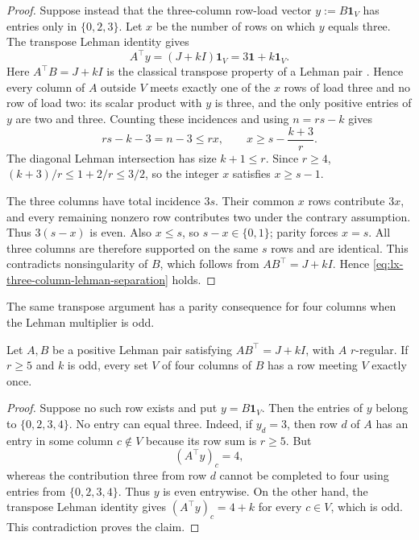 \begin{proof}
Suppose instead that the three-column row-load vector
$y:=B\mathbf1_V$ has entries only in $\{0,2,3\}$.  Let $x$ be the number of
rows on which $y$ equals three.  The transpose Lehman identity gives
\[
 A^\top y=(J+kI)\mathbf1_V=3\mathbf1+k\mathbf1_V.
 \tag{LH-3a}\label{eq:lx-three-column-transpose-count}
\]
Here $A^\top B=J+kI$ is the classical transpose property of a Lehman pair
\citep{CornuejolsGueninTuncel2009}.
Hence every column of $A$ outside $V$ meets exactly one of the $x$ rows of
load three and no row of load two: its scalar product with $y$ is three, and
the only positive entries of $y$ are two and three.  Counting these
incidences and using $n=rs-k$ gives
\[
 rs-k-3=n-3\leq rx,
 \qquad
 x\geq s-\frac{k+3}{r}.                            \tag{LH-3b}
 \label{eq:lx-three-column-capacity}
\]
The diagonal Lehman intersection has size $k+1\leq r$.  Since $r\geq4$,
$(k+3)/r\leq1+2/r\leq3/2$, so the integer $x$ satisfies $x\geq s-1$.

The three columns have total incidence $3s$.  Their common $x$ rows
contribute $3x$, and every remaining nonzero row contributes two under the
contrary assumption.  Thus $3(s-x)$ is even.  Also $x\leq s$, so
$s-x\in\{0,1\}$; parity forces $x=s$.  All three columns are therefore
supported on the same $s$ rows and are identical.  This contradicts
nonsingularity of $B$, which follows from
$AB^\top=J+kI$.  Hence
\eqref{eq:lx-three-column-lehman-separation} holds.
\end{proof}

The same transpose argument has a parity consequence for four columns when
the Lehman multiplier is odd.

\begin{lemma}
\label{lem:lx-four-column-odd-lehman-separation}
Let $A,B$ be a positive Lehman pair satisfying $AB^\top=J+kI$, with $A$
$r$-regular.  If $r\geq5$ and $k$ is odd, every set $V$ of four columns of
$B$ has a row meeting $V$ exactly once.
\end{lemma}

\begin{proof}
Suppose no such row exists and put $y=B\mathbf1_V$.  Then the entries of $y$
belong to $\{0,2,3,4\}$.  No entry can equal three.  Indeed, if $y_d=3$,
then row $d$ of $A$ has an entry in some column $c\notin V$ because its row
sum is $r\geq5$.  But
\[
 (A^\top y)_c=4,
\]
whereas the contribution three from row $d$ cannot be completed to four
using entries from $\{0,2,3,4\}$.  Thus $y$ is even entrywise.  On the other
hand, the transpose Lehman identity gives
$(A^\top y)_c=4+k$ for every $c\in V$, which is odd.  This contradiction
proves the claim.
\end{proof}


